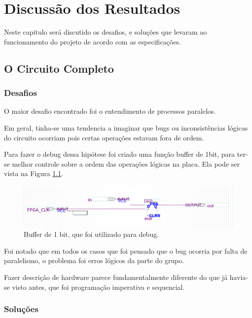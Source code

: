 \chapter{Discussão dos Resultados}\label{cap_5_Resultados}

Neste capitulo será discutido os desafios, e soluções que levaram ao funcionamento do projeto de acordo com as especificações.

\section{O Circuito Completo}

\subsection{Desafios}

O maior desafio encontrado foi o entendimento de processos paralelos. 

Em geral, tinha-se uma tendencia a imaginar que bugs ou inconsistências lógicas do circuito ocorriam pois certas operações estavam fora de ordem.

Para fazer o debug dessa hipótese foi criado uma função buffer de 1bit, para ter-se melhor controle sobre a ordem das operações lógicas na placa. Ela pode ser vista na Figura \ref{fig:5.1}.

\begin{figure}[H]
	\centering
	\includegraphics[width=1\columnwidth]{FIGURAS/cap_5/buffer_1bit.png}
	\caption{Buffer de 1 bit, que foi utilizado para debug.}
        \label{fig:5.1}
\end{figure}

Foi notado que em todos os casos que foi pensado que o bug ocorria por falta de paralelismo, o problema foi erros lógicos da parte do grupo.

Fazer descrição de hardware parece fundamentalmente diferente do que já havia-se visto antes, que foi programação imperativa e sequencial.

\subsection{Soluções}

